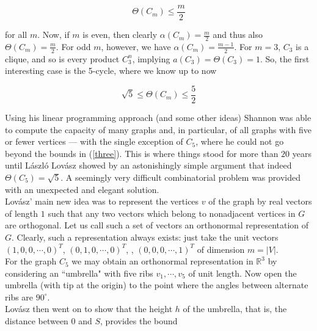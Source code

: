 \documentclass[openany,12pt]{memoir}
\begin{document}
\begin{equation*}
  \Theta(C_m) \leq \frac{m}{2}
\end{equation*}

for all $m$. Now, if $m$ is even, then clearly $\alpha(C_m) = \frac{m}{2}$
and thus also $\Theta(C_m) = \frac{m}{2}$. For odd $m$, however, we have $\alpha(C_m) = \frac{m-1}{2}$. 
For $m = 3$, $C_3$ is a clique, and so is every product $C_3^n$, implying $a(C_3) = \Theta(C_3) = 1$. 
So, the first interesting case is the 5-cycle, where we know up to now 

\begin{equation}
  \sqrt{5} \leq \Theta(C_m) \leq \frac{5}{2} \label{three}
\end{equation}

Using his linear programming approach (and some other ideas) Shannon 
was able to compute the capacity of many graphs and, in particular, of all 
graphs with five or fewer vertices --- with the single exception of $C_5$, where 
he could not go beyond the bounds in (\ref{three}). This is where things stood for 
more than $20$ years until L\'aszl\'o Lov\'asz showed by an astonishingly simple argument
that indeed $\Theta(C_5) = \sqrt{5}$. A seemingly very difficult combinatorial 
problem was provided with an unexpected and elegant solution.\\

Lov\'asz' main new idea was to represent the vertices $v$ of the graph by 
real vectors of length $1$ such that any two vectors which belong to nonadjacent 
vertices in $G$ are orthogonal. Let us call such a set of vectors 
an orthonormal representation of $G$. Clearly, such a representation always 
exists: just take the unit vectors $(1,0,0,\dotsb,0)^T$, $(0,1,0,\dotsb,0)^T$, \dotsb,
$(0,0,0,\dotsb,1)^T$ of dimension $m=|V|$.\\


For the graph $C_5$ we may obtain an orthonormal representation in $\mathbb{R}^3$ by 
considering an ``umbrella" with five ribs $v_1, \dotsb , v_5$ of unit length. Now 
open the umbrella (with tip at the origin) to the point where the angles 
between alternate ribs are $90^\circ$. \\
Lov\'asz then went on to show that the height $h$ of the umbrella, that is, the 
distance between $0$ and $S$, provides the bound
\end{document}
